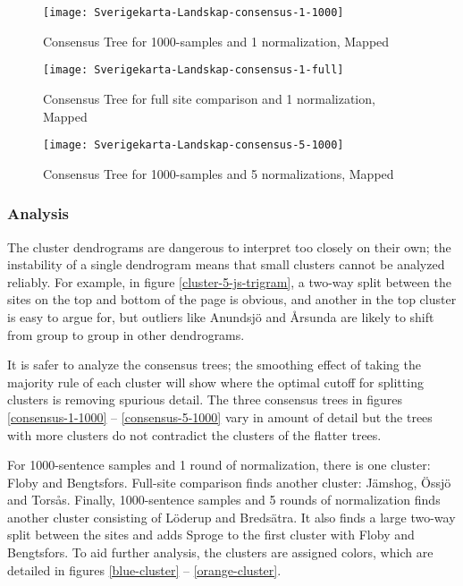 \begin{figure}
\texttt{[image: Sverigekarta-Landskap-consensus-1-1000]}
\caption{Consensus Tree for 1000-samples and 1 normalization, Mapped}
\label{map-consensus-1-1000}
\end{figure}

\begin{figure}
\texttt{[image: Sverigekarta-Landskap-consensus-1-full]}
\caption{Consensus Tree for full site comparison and 1 normalization, Mapped}
\label{map-consensus-1-full}
\end{figure}

\begin{figure}
\texttt{[image: Sverigekarta-Landskap-consensus-5-1000]}
\caption{Consensus Tree for 1000-samples and 5 normalizations, Mapped}
\label{map-consensus-5-1000}
\end{figure}


\subsubsection{Analysis}

The cluster dendrograms are dangerous to interpret too closely on
their own; the instability of a single dendrogram means that small
clusters cannot be analyzed reliably. For example, in figure
\ref{cluster-5-js-trigram}, a two-way split between the sites on the
top and bottom of the page is obvious, and another in the top cluster
is easy to argue for, but outliers like Anundsj\"o and \AA{}rsunda are
likely to shift from group to group in other dendrograms.

It is safer to analyze the consensus trees; the smoothing effect of
taking the majority rule of each cluster will show where the optimal
cutoff for splitting clusters is removing spurious detail. The three
consensus trees in figures \ref{consensus-1-1000} --
\ref{consensus-5-1000} vary in amount of detail but the trees with
more clusters do not contradict the clusters of the flatter trees.

For 1000-sentence samples and 1 round of normalization, there is one
cluster: Floby and Bengtsfors. Full-site comparison finds
another cluster: J\"amshog, \"Ossj\"o and Tors\aa{}s. Finally,
1000-sentence samples and 5 rounds of normalization finds another
cluster consisting of L\"oderup and Breds\"atra. It also finds
a large two-way split between the sites and adds Sproge to the first
cluster with Floby and Bengtsfors. To aid further analysis, the
clusters are assigned colors, which are detailed in figures
\ref{blue-cluster} -- \ref{orange-cluster}. 

